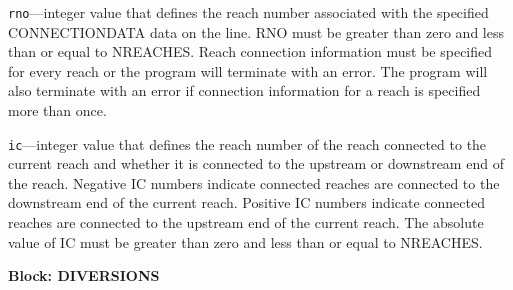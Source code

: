 \begin{description}
\item \texttt{rno}---integer value that defines the reach number associated with the specified CONNECTIONDATA data on the line. RNO must be greater than zero and less than or equal to NREACHES. Reach connection information must be specified for every reach or the program will terminate with an error.  The program will also terminate with an error if connection information for a reach is specified more than once.

\item \texttt{ic}---integer value that defines the reach number of the reach connected to the current reach and whether it is connected to the upstream or downstream end of the reach. Negative IC numbers indicate connected reaches are connected to the downstream end of the current reach. Positive IC numbers indicate connected reaches are connected to the upstream end of the current reach. The absolute value of IC must be greater than zero and less than or equal to NREACHES.

\end{description}
\item \textbf{Block: DIVERSIONS}

